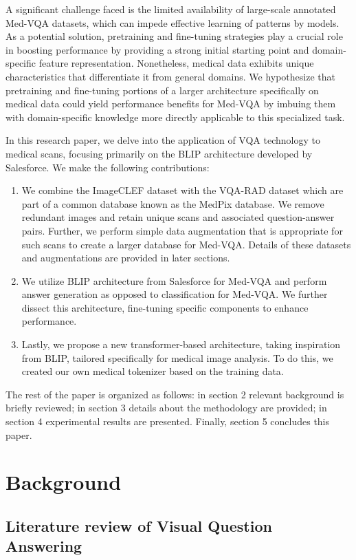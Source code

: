 \documentclass[pdflatex,sn-mathphys-num]{sn-jnl}%
\begin{document}
A significant challenge faced is the limited availability of large-scale annotated Med-VQA datasets, which can impede effective learning of patterns by models. As a potential solution, pretraining and fine-tuning strategies play a crucial role in boosting performance by providing a strong initial starting point and domain-specific feature representation. Nonetheless, medical data exhibits unique characteristics that differentiate it from general domains. We hypothesize that pretraining and fine-tuning portions of a larger architecture specifically on medical data could yield performance benefits for Med-VQA by imbuing them with domain-specific knowledge more directly applicable to this specialized task.

In this research paper, we delve into the application of VQA technology to medical scans, focusing primarily on the BLIP architecture developed by Salesforce. We make the following contributions:
\begin{enumerate}
\item We combine the ImageCLEF dataset with the VQA-RAD\cite{vqa_rad} dataset which are part of a common database known as the MedPix database. We remove redundant images and retain unique scans and associated question-answer pairs. Further, we perform simple data augmentation that is appropriate for such scans to create a larger database for Med-VQA. Details of these datasets and augmentations are provided in later sections.
\item We utilize BLIP architecture from Salesforce for Med-VQA and perform answer generation as opposed to classification for Med-VQA. We further dissect this architecture, fine-tuning specific components to enhance performance.
\item Lastly, we propose a new transformer-based architecture, taking inspiration from BLIP, tailored specifically for medical image analysis. To do this, we created our own medical tokenizer based on the training data.
\end{enumerate}
The rest of the paper is organized as follows: in section 2 relevant background is briefly reviewed; in section 3 details about the methodology are provided; in section 4 experimental results are presented. Finally, section 5 concludes this paper.

\section{Background}\label{sec2}

\subsection{Literature review of Visual Question Answering}\label{subsec2.1}
\end{document}
